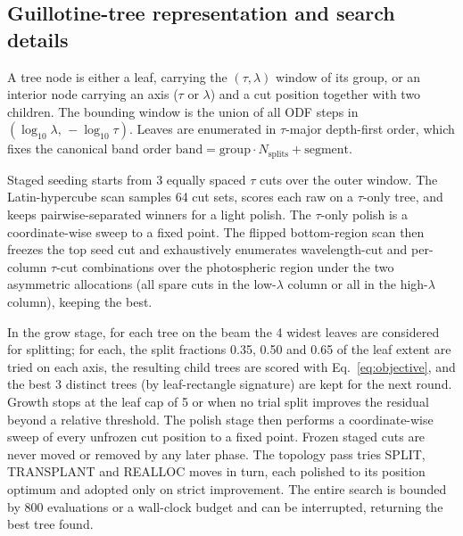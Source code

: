 \documentclass{aa}
\begin{document}
\begin{appendix}

\section{Guillotine-tree representation and search details}
\label{app:search}

   A tree node is either a leaf, carrying the $(\tau,\lambda)$ window of
   its group, or an interior node carrying an axis ($\tau$ or $\lambda$)
   and a cut position together with two children. The bounding window is
   the union of all ODF steps in $(\log_{10}\lambda,\,-\log_{10}\tau)$.
   Leaves are enumerated in $\tau$-major depth-first order, which fixes
   the canonical band order
   $\mathrm{band}=\mathrm{group}\cdot N_\mathrm{splits}+\mathrm{segment}$.

   Staged seeding starts from 3 equally spaced $\tau$ cuts over the
   outer window. The Latin-hypercube scan samples 64 cut sets, scores
   each raw on a $\tau$-only tree, and keeps pairwise-separated winners
   for a light polish. The $\tau$-only polish is a coordinate-wise sweep
   to a fixed point. The flipped bottom-region scan then freezes the top
   seed cut and exhaustively enumerates wavelength-cut and per-column
   $\tau$-cut combinations over the photospheric region under the two
   asymmetric allocations (all spare cuts in the low-$\lambda$ column or
   all in the high-$\lambda$ column), keeping the best.

   In the grow stage, for each tree on the beam the 4 widest leaves are
   considered for splitting; for each, the split fractions 0.35, 0.50
   and 0.65 of the leaf extent are tried on each axis,
   the resulting child trees are scored with Eq.~\ref{eq:objective}, and
   the best 3 distinct trees (by leaf-rectangle signature) are kept for
   the next round. Growth stops at the leaf cap
   of 5 or when no trial split improves the
   residual beyond a relative threshold. The polish stage then performs a
   coordinate-wise sweep of every unfrozen cut position to a fixed point.
   Frozen staged cuts are never moved or removed by any later phase. The
   topology pass tries SPLIT, TRANSPLANT and REALLOC moves in turn, each
   polished to its position optimum and adopted only on strict
   improvement. The
   entire search is bounded by 800 evaluations or a
   wall-clock budget and can be interrupted, returning the best tree
   found.

\end{appendix}



\end{document}

